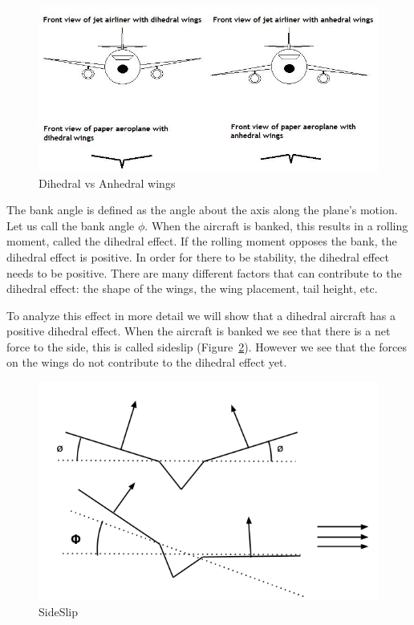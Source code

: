 \begin{figure}[hl]
  \centering
    \includegraphics[scale=.5]{figures/dihedraleffect.png}
    \caption{Dihedral vs Anhedral wings}
  \label{fig:dihedraleffect}
\end{figure}

The bank angle is defined as the angle about the axis along
the plane's motion. Let us call the bank angle $\phi$. When the aircraft is
banked, this results in a rolling moment, called the dihedral effect. If the
rolling moment opposes the bank, the dihedral effect is positive. In order for
there to be stability, the dihedral effect needs to be positive. There are many
different factors that can contribute to the dihedral effect: the shape of the wings,
the wing placement, tail height, etc. 

To analyze this effect in more detail we will show that a dihedral aircraft has 
a positive dihedral effect. When the aircraft is banked we see that there is a net force
to the side, this is called sideslip (Figure~\ref{fig:dihedral1}). 
However we see that the forces on the wings do not 
contribute to the dihedral effect yet.


\begin{figure}[hl]
  \centering
    \includegraphics[scale=.5]{figures/dihedral1.png}
    \caption{SideSlip}
  \label{fig:dihedral1}
\end{figure}

